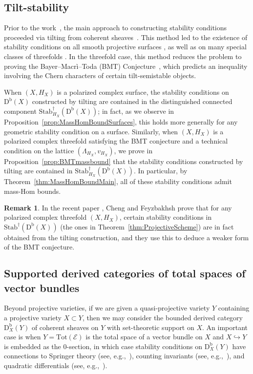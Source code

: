 \documentclass[11pt, reqno]{amsart}
\numberwithin{equation}{section}
\theoremstyle{plain}
\theoremstyle{remark}
\theoremstyle{definition}
\newtheorem{remark}[theorem]{Remark}
\theoremstyle{italicsname}
\newcommand{\Db}{\mathrm{D^b}}
\newcommand{\Stabdagger}{\mathrm{Stab}^\dagger}
\newcommand{\cE}{\mathcal{E}}
\begin{document}
\subsection{Tilt-stability} 
Prior to the work~\cite{chunyi-stability}, the main approach to constructing stability conditions proceeded via tilting from coherent sheaves~\cite{Bridgeland:K3,TodaK3,BMT:BG,BMS:StabCY3s}. 
This method led to the existence of stability conditions on all smooth projective surfaces \cite{ArcaraBertram}, as well as on many special classes of threefolds \cite{Li:FanoThreefolds,Li:CY,FKLR:CY,LiuMao:Tilt,PT:Moduli}. 
In the threefold case, this method reduces the problem to proving the Bayer--Macr\`{i}--Toda (BMT) Conjecture~\cite[Conjecture 4.1]{BMS:StabCY3s}, which predicts an inequality involving the Chern characters of certain tilt-semistable objects.

When $(X, H_X)$ is a polarized complex surface, the stability conditions on $\Db(X)$ constructed by tilting are contained in the distinguished connected component $\Stabdagger_{H_X}(\Db(X))$; in fact, as we observe in Proposition~\ref{prop:MassHomBoundSurfaces}, this holds more generally for any geometric stability condition on a surface. 
Similarly, when $(X, H_X)$ is a polarized complex threefold satisfying the BMT conjecture and a technical condition on the lattice $(\Lambda_{H_X}, v_{H_X})$, we prove in Proposition~\ref{prop:BMTmassbound} that the stability conditions constructed by tilting are contained in $\Stabdagger_{H_X}(\Db(X))$. 
In particular, by Theorem~\ref{thm:MassHomBoundMain}, all of these stability conditions admit mass-Hom bounds. 
  
\begin{remark}
    In the recent paper \cite{FeyYiran:Threefolds}, Cheng and Feyzbakhsh prove that for any polarized complex threefold $(X, H_X)$, certain stability conditions in $\Stabdagger(\Db(X))$ (the ones in Theorem~\ref{thm:ProjectiveScheme}) are in fact obtained from the tilting construction, and they use this to deduce a weaker form of the BMT conjecture.
\end{remark}

\subsection{Supported derived categories of total spaces of vector bundles} 

Beyond projective varieties, if we are given a quasi-projective variety $Y$ containing a projective variety $X \subset Y$, then we may consider the bounded derived category $\mathrm{D}_X^{\mathrm{b}}(Y)$ of coherent sheaves on $Y$ with set-theoretic support on $X$. 
An important case is when $Y = \mathrm{Tot}(\cE)$ is the total space of a vector bundle on $X$ and $X \hookrightarrow Y$ is embedded as the $0$-section, in which case stability conditions on $\mathrm{D}_X^{\mathrm{b}}(Y)$ have connections to  Springer theory (see, e.g.,~\cite{Bridgeland:NonCompactCY,ABM:Stability}),  counting invariants (see, e.g.,~\cite{Bou:Takahashi,BDLP:Dentroscopy}), and quadratic differentials (see, e.g.,~\cite{BridgelandSmith:IHES,HKK}).  
\end{document}
